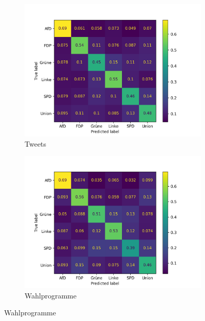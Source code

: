 \begin{figure}[H]
    \centering
    \begin{subfigure}{0.49\textwidth}
        \includegraphics[width=\textwidth]{data/images/modeling/baseline/under/tweets_confusion_matrix.png}
        \caption{Tweets}
        \label{sfig:confusionMatrixBaselineTweets}
    \end{subfigure}
    \hfill
    \begin{subfigure}{0.49\textwidth}
        \includegraphics[width=\textwidth]{data/images/modeling/baseline/under/party_programs_confusion_matrix.png}
        \caption{Wahlprogramme}
        \label{sfig:confusionMatrixBaselineManifest}
    \end{subfigure}

\end{figure}
